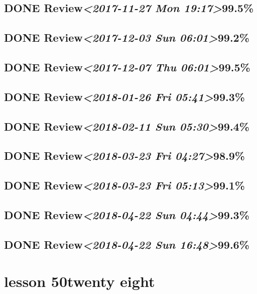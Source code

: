 \documentclass[11pt]{ctexart}
\begin{document}
\subsection{{\bfseries\sffamily DONE} Review\textit{<2017-11-27 Mon 19:17>}99.5\%}
\label{sec:org155c1d0}
\subsection{{\bfseries\sffamily DONE} Review\textit{<2017-12-03 Sun 06:01>}99.2\%}
\label{sec:org40f3946}
\subsection{{\bfseries\sffamily DONE} Review\textit{<2017-12-07 Thu 06:01>}99.5\%}
\label{sec:orgc01c82f}
\subsection{{\bfseries\sffamily DONE} Review\textit{<2018-01-26 Fri 05:41>}99.3\%}
\label{sec:orgc593d64}
\subsection{{\bfseries\sffamily DONE} Review\textit{<2018-02-11 Sun 05:30>}99.4\%}
\label{sec:org9f24cc3}
\subsection{{\bfseries\sffamily DONE} Review\textit{<2018-03-23 Fri 04:27>}98.9\%}
\label{sec:org3ba5f21}
\subsection{{\bfseries\sffamily DONE} Review\textit{<2018-03-23 Fri 05:13>}99.1\%}
\label{sec:orgac07f69}
\subsection{{\bfseries\sffamily DONE} Review\textit{<2018-04-22 Sun 04:44>}99.3\%}
\label{sec:org65d0d44}
\subsection{{\bfseries\sffamily DONE} Review\textit{<2018-04-22 Sun 16:48>}99.6\%}
\label{sec:orga1235fb}
\section{lesson 50twenty eight}
\label{sec:orgcaa9e79}
\end{document}
